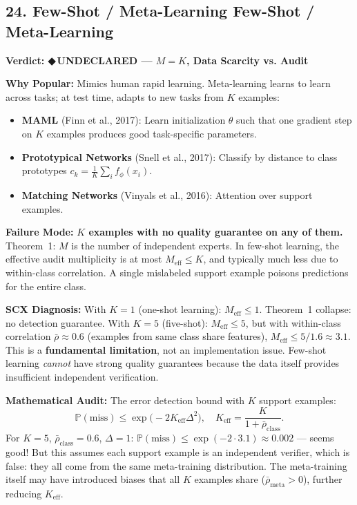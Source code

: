 \documentclass[12pt,a4paper]{article}
\theoremstyle{definition}
\newcommand{\guilty}{{\color{guiltycolor}\textbf{◆\,UNDECLARED}}}
\newcommand{\Pbb}{\mathbb{P}}
\newcommand{\auditHeader}[1]{\medskip\noindent\textbf{\large #1}\medskip}
\newcommand{\whyPopular}{\noindent\textbf{Why Popular:} }
\newcommand{\whyFail}{\noindent\textbf{Failure Mode:} }
\newcommand{\diagnosis}{\noindent\textbf{SCX Diagnosis:} }
\newcommand{\mathAudit}{\noindent\textbf{Mathematical Audit:} }
\begin{document}
\subsection{24. Few-Shot / Meta-Learning Few-Shot / Meta-Learning}

\auditHeader{Verdict: \guilty{} — $M=K$, Data Scarcity vs. Audit}

\whyPopular{} Mimics human rapid learning. Meta-learning learns to learn across tasks; at test time, adapts to new tasks from $K$ examples:
\begin{itemize}[nosep]
    \item \textbf{MAML} (Finn et al., 2017): Learn initialization $\theta$ such that one gradient step on $K$ examples produces good task-specific parameters.
    \item \textbf{Prototypical Networks} (Snell et al., 2017): Classify by distance to class prototypes $c_k = \frac{1}{K}\sum_i f_\phi(x_i)$.
    \item \textbf{Matching Networks} (Vinyals et al., 2016): Attention over support examples.
\end{itemize}

\whyFail{} \textbf{$K$ examples with no quality guarantee on any of them.} Theorem~1: $M$ is the number of independent experts. In few-shot learning, the effective audit multiplicity is at most $M_{\text{eff}} \le K$, and typically much less due to within-class correlation. A single mislabeled support example poisons predictions for the entire class.

\diagnosis{} With $K=1$ (one-shot learning): $M_{\text{eff}} \le 1$. Theorem~1 collapse: no detection guarantee. With $K=5$ (five-shot): $M_{\text{eff}} \le 5$, but with within-class correlation $\bar{\rho} \approx 0.6$ (examples from same class share features), $M_{\text{eff}} \le 5/1.6 \approx 3.1$. This is a \textbf{fundamental limitation}, not an implementation issue. Few-shot learning \textit{cannot} have strong quality guarantees because the data itself provides insufficient independent verification.

\mathAudit{} The error detection bound with $K$ support examples:
\[
\Pbb(\text{miss}) \le \exp\bigl(-2K_{\text{eff}}\Delta^2\bigr), \quad K_{\text{eff}} = \frac{K}{1 + \bar{\rho}_{\text{class}}}.
\]
For $K=5$, $\bar{\rho}_{\text{class}}=0.6$, $\Delta=1$: $\Pbb(\text{miss}) \le \exp(-2 \cdot 3.1) \approx 0.002$ — seems good! But this assumes each support example is an independent verifier, which is false: they all come from the same meta-training distribution. The meta-training itself may have introduced biases that all $K$ examples share ($\bar{\rho}_{\text{meta}} > 0$), further reducing $K_{\text{eff}}$.
\end{document}
